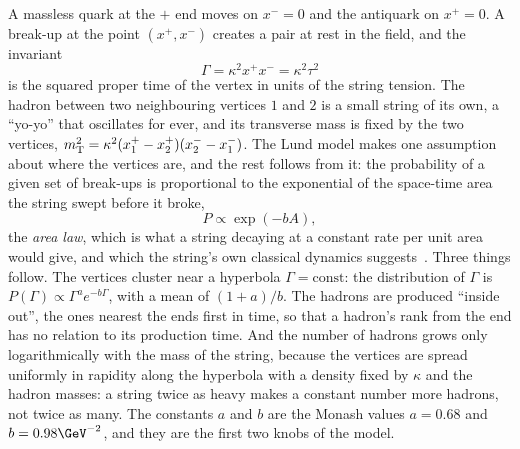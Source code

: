 A massless quark at the $+$ end moves on $x^-=0$ and the antiquark on
$x^+=0$. A break-up at the point $(x^+,x^-)$
creates a pair at rest in the field, and the invariant
\begin{equation}
  \Gamma=\kappa^2x^+x^-=\kappa^2\tau^2
  \label{eq:children_getting_married:gamma}
\end{equation}
is the squared proper time of the vertex in units of the string tension.
The hadron between two neighbouring vertices $1$ and $2$ is a small string
of its own, a ``yo-yo'' that oscillates for ever, and its transverse mass
is fixed by the two vertices, $m_{\mathrm{T}}^2=\kappa^2(x_1^+-x_2^+)(x_2^--x_1^-)$.
The Lund model makes one assumption about where the vertices are, and the
rest follows from it: the probability of a given set of break-ups is
proportional to the exponential of the space-time area the string swept
before it broke,
\begin{equation}
  P\propto\exp(-bA),
  \label{eq:children_getting_married:area_law}
\end{equation}
the \emph{area law}, which is what a string decaying at a constant rate per
unit area would give, and which the string's own classical dynamics
suggests~\cite{Artru:1974hr}. Three things follow. The vertices cluster
near a hyperbola $\Gamma=\mathrm{const}$: the distribution of $\Gamma$ is
$P(\Gamma)\propto\Gamma^a e^{-b\Gamma}$, with a mean of $(1+a)/b$. The
hadrons are produced ``inside out'', the ones nearest the ends first in
time, so that a hadron's rank from the end has no relation to its
production time. And the number of hadrons grows only logarithmically with
the mass of the string, because the vertices are spread uniformly in
rapidity along the hyperbola with a density fixed by $\kappa$ and the
hadron masses: a string twice as heavy makes a constant number more
hadrons, not twice as many. The constants $a$ and $b$ are the Monash
values $a=0.68$ and $b=0.98\GeV^{-2}$, and they are the first two knobs of
the model.

